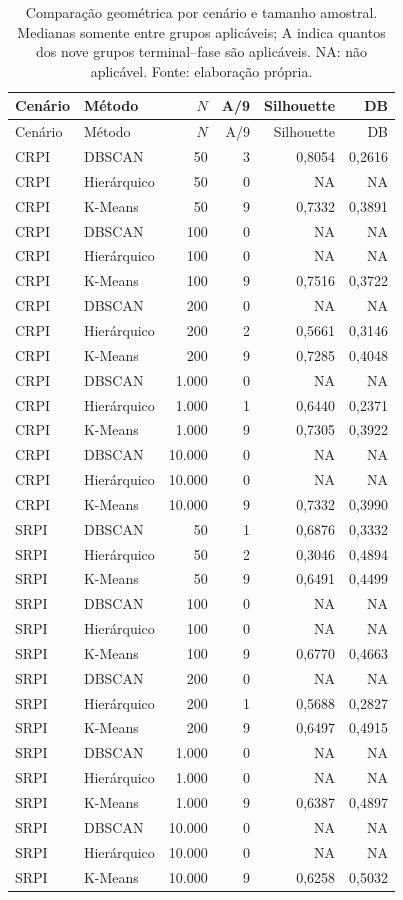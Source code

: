 \begingroup\small
\setlength{\LTpre}{0pt}
\begin{longtable}{llrrrr}
\caption{Comparação geométrica por cenário e tamanho amostral. Medianas somente entre grupos aplicáveis; A indica quantos dos nove grupos terminal--fase são aplicáveis. NA: não aplicável. Fonte: elaboração própria.}\label{tab:cluster-summary}\\
\hline Cenário & Método & $N$ & A/9 & Silhouette & DB \\
\hline\endfirsthead
\hline Cenário & Método & $N$ & A/9 & Silhouette & DB \\
\hline\endhead
CRPI & DBSCAN & 50 & 3 & 0,8054 & 0,2616 \\
CRPI & Hierárquico & 50 & 0 & NA & NA \\
CRPI & K-Means & 50 & 9 & 0,7332 & 0,3891 \\
CRPI & DBSCAN & 100 & 0 & NA & NA \\
CRPI & Hierárquico & 100 & 0 & NA & NA \\
CRPI & K-Means & 100 & 9 & 0,7516 & 0,3722 \\
CRPI & DBSCAN & 200 & 0 & NA & NA \\
CRPI & Hierárquico & 200 & 2 & 0,5661 & 0,3146 \\
CRPI & K-Means & 200 & 9 & 0,7285 & 0,4048 \\
CRPI & DBSCAN & 1.000 & 0 & NA & NA \\
CRPI & Hierárquico & 1.000 & 1 & 0,6440 & 0,2371 \\
CRPI & K-Means & 1.000 & 9 & 0,7305 & 0,3922 \\
CRPI & DBSCAN & 10.000 & 0 & NA & NA \\
CRPI & Hierárquico & 10.000 & 0 & NA & NA \\
CRPI & K-Means & 10.000 & 9 & 0,7332 & 0,3990 \\
SRPI & DBSCAN & 50 & 1 & 0,6876 & 0,3332 \\
SRPI & Hierárquico & 50 & 2 & 0,3046 & 0,4894 \\
SRPI & K-Means & 50 & 9 & 0,6491 & 0,4499 \\
SRPI & DBSCAN & 100 & 0 & NA & NA \\
SRPI & Hierárquico & 100 & 0 & NA & NA \\
SRPI & K-Means & 100 & 9 & 0,6770 & 0,4663 \\
SRPI & DBSCAN & 200 & 0 & NA & NA \\
SRPI & Hierárquico & 200 & 1 & 0,5688 & 0,2827 \\
SRPI & K-Means & 200 & 9 & 0,6497 & 0,4915 \\
SRPI & DBSCAN & 1.000 & 0 & NA & NA \\
SRPI & Hierárquico & 1.000 & 0 & NA & NA \\
SRPI & K-Means & 1.000 & 9 & 0,6387 & 0,4897 \\
SRPI & DBSCAN & 10.000 & 0 & NA & NA \\
SRPI & Hierárquico & 10.000 & 0 & NA & NA \\
SRPI & K-Means & 10.000 & 9 & 0,6258 & 0,5032 \\
\hline
\end{longtable}
\endgroup
